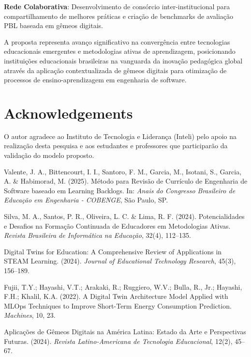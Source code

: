 \documentclass[english, spanish, brazilian]{RBIEarticle} %
\begin{document}
\textbf{Rede Colaborativa}: Desenvolvimento de consórcio inter-institucional para compartilhamento de melhores práticas e criação de benchmarks de avaliação PBL baseada em gêmeos digitais.

A proposta representa avanço significativo na convergência entre tecnologias
educacionais emergentes e metodologias ativas de aprendizagem, posicionando
instituições educacionais brasileiras na vanguarda da inovação pedagógica
global através da aplicação contextualizada de gêmeos digitais para otimização
de processos de ensino-aprendizagem em engenharia de software.

\section*{Acknowledgements}
O autor agradece ao Instituto de Tecnologia e Liderança (Inteli) pelo apoio na realização desta pesquisa e aos estudantes e professores que participarão da validação do modelo proposto.



\begin{thebibliography}{99}

  Valente, J. A., Bittencourt, I. I., Santoro, F. M., Garcia, M., Isotani, S., Garcia, A. \& Habimorad, M. (2025). Método para Revisão de Currículo de Engenharia de Software baseado em Learning Backlogs. In: \textit{Anais do Congresso Brasileiro de Educação em Engenharia - COBENGE}, São Paulo, SP.

  Silva, M. A., Santos, P. R., Oliveira, L. C. \& Lima, R. F. (2024). Potencialidades e Desafios na Formação Continuada de Educadores em Metodologias Ativas. \textit{Revista Brasileira de Informática na Educação}, 32(4), 112--135.

  Digital Twins for Education: A Comprehensive Review of Applications in STEAM Learning. (2024). \textit{Journal of Educational Technology Research}, 45(3), 156--189.

  Fujii, T.Y.; Hayashi, V.T.; Arakaki, R.; Ruggiero, W.V.; Bulla, R., Jr.; Hayashi, F.H.; Khalil, K.A. (2022). A Digital Twin Architecture Model Applied with MLOps Techniques to Improve Short-Term Energy Consumption Prediction. \textit{Machines}, 10, 23.

  Aplicações de Gêmeos Digitais na América Latina: Estado da Arte e Perspectivas Futuras. (2024). \textit{Revista Latino-Americana de Tecnologia Educacional}, 12(2), 45--67.

\end{thebibliography}

\end{document}
